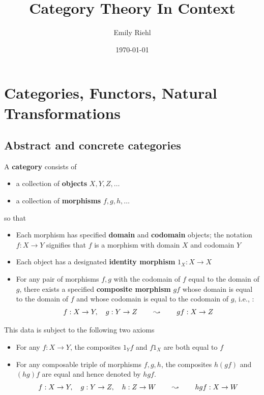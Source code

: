 \documentclass[11pt]{article}
\author{Emily Riehl}
\date{\today}
\title{Category Theory In Context}
\begin{document}
\maketitle
\tableofcontents


\section{Categories, Functors, Natural Transformations}
\label{sec:org7bba68c}
\subsection{Abstract and concrete categories}
\label{sec:orgcbf87b6}
\begin{definition}[]
A \textbf{category} consists of
\begin{itemize}
\item a collection of \textbf{objects} \(X,Y,Z,\dots\)
\item a collection of \textbf{morphisms} \(f,g,h,\dots\)
\end{itemize}


so that
\begin{itemize}
\item Each morphism has specified \textbf{domain} and \textbf{codomain} objects; the notation \(f:X\to Y\)
signifies that \(f\) is a morphism with domain \(X\) and codomain \(Y\)
\item Each object has a designated \textbf{identity morphism} \(1_X:X\to X\)
\item For any pair of morphisms \(f,g\) with the codomain of \(f\) equal to the domain of \(g\),
there exists a specified \textbf{composite morphism} \(gf\) whose domain is equal to the domain
of \(f\) and whose codomain is equal to the codomain of \(g\), i.e., :
\begin{equation*}
f:X\to Y,\quad g:Y\to Z\hspace{0.7cm}\leadsto\hspace{0.7cm}gf:X\to Z
\end{equation*}
\end{itemize}


This data is subject to the following two axioms
\begin{itemize}
\item For any \(f:X\to Y\), the composites \(1_Yf\) and \(f1_X\) are both equal to \(f\)
\item For any composable triple of morphisms \(f,g,h\), the composites \(h(gf)\) and \((hg)f\) are
equal and hence denoted by \(hgf\).
\begin{equation*}
f:X\to Y,\quad g:Y\to Z,\quad h:Z\to W\hspace{0.7cm}\leadsto\hspace{0.7cm}hgf:X\to W
\end{equation*}
\end{itemize}
\end{definition}
\end{document}
